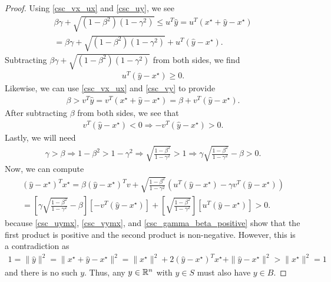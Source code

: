 \begin{proof}
Using \cref{csc_vx_ux} and \cref{csc_uy}, we see
\begin{align*}
\beta\gamma + \sqrt{\left(1 - \beta^2\right)\left(1 - \gamma^2\right)} \le {u}^T\hat y = {u}^T\left(x^{\star} + \hat y - x^{\star}\right) \\
= \beta \gamma + \sqrt{(1 - \beta^2)\left(1 - \gamma^2\right)} + {u}^T\left(\hat y - x^{\star}\right).
\end{align*}
Subtracting $\beta\gamma + \sqrt{\left(1 - \beta^2\right)\left(1 - \gamma^2\right)}$ from both sides, we find
\begin{align}
{u}^T\left(\hat y - x^{\star}\right) \ge 0 \label{csc_uymx}.
\end{align}
Likewise, we can use \cref{csc_vx_ux} and \cref{csc_vy} to provide
\begin{align*}
\beta > {v}^T\hat y = {v}^T\left(x^{\star} + \hat y - x^{\star}\right) = \beta + {v}^T\left(\hat y - x^{\star}\right).
\end{align*}
After subtracting $\beta$ from both sides, we see that
\begin{align}
{v}^T\left(\hat y - x^{\star}\right) < 0 \Longrightarrow -{v}^T\left(\hat y - x^{\star}\right) > 0. \label{csc_vymx}
\end{align}
Lastly, we will need
\begin{align}
\gamma > \beta 
\Longrightarrow 1 - \beta^2 > 1 - \gamma^2
\Longrightarrow \sqrt{\frac{1 - \beta^2}{1 - \gamma^2}} > 1
\Longrightarrow \gamma \sqrt{\frac{1 - \beta^2}{1 - \gamma^2}} - \beta > 0. \label{csc_gamma_beta_positive}
\end{align}
Now, we can compute
\begin{align*}
{\left(\hat y - x^{\star}\right)}^Tx^{\star} = 
\beta {\left(\hat y - x^{\star}\right)}^Tv
+ \sqrt{\frac{1 - \beta^2}{1 - \gamma^2}} 
\left(u^T\left(\hat y - x^{\star}\right) - \gamma v^T \left(\hat y - x^{\star}\right) \right)\\ 
= \left[\gamma \sqrt{\frac{1 - \beta^2}{1 - \gamma^2}} - \beta\right] \left[-v^T\left(\hat y - x^{\star}\right)\right]
+ \left[\sqrt{\frac{1 - \beta^2}{1 - \gamma^2}}\right] \left[u^T\left(\hat y - x^{\star}\right) \right] > 0.
\end{align*}
because \cref{csc_uymx}, \cref{csc_vymx}, and \cref{csc_gamma_beta_positive} show that the first product is positive and the second product is non-negative.
However, this is a contradiction as
\begin{align*}
1 = \|\hat y\|^2 = \|x^{\star} + \hat y - x^{\star}\|^2 = \|x^{\star}\|^2 + 2{\left(\hat y - x^{\star}\right)}^Tx^{\star} + \|\hat y - x^{\star}\|^2 > \|x^{\star}\|^2 = 1
\end{align*}
and there is no such $y$.
Thus, any $y \in\mathbb R^n$ with $y \in S$ must also have $y \in B$.
\end{proof}


